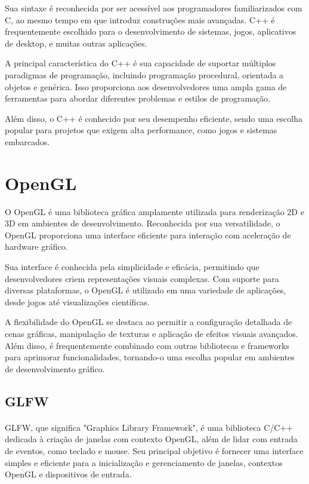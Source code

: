 \documentclass[12pt,a4paper]{memoir}
\begin{document}
Sua sintaxe é reconhecida por ser acessível aos programadores familiarizados com C, ao mesmo tempo em que introduz construções mais avançadas. C++ é frequentemente escolhido para o desenvolvimento de sistemas, jogos, aplicativos de desktop, e muitas outras aplicações.

A principal característica do C++ é sua capacidade de suportar múltiplos paradigmas de programação, incluindo programação procedural, orientada a objetos e genérica. Isso proporciona aos desenvolvedores uma ampla gama de ferramentas para abordar diferentes problemas e estilos de programação.

Além disso, o C++ é conhecido por seu desempenho eficiente, sendo uma escolha popular para projetos que exigem alta performance, como jogos e sistemas embarcados.



\section{OpenGL}
\label{chap2:sec:opengl}
O OpenGL é uma biblioteca gráfica amplamente utilizada para renderização 2D e 3D em ambientes de desenvolvimento. Reconhecida por sua versatilidade, o OpenGL proporciona uma interface eficiente para interação com aceleração de hardware gráfico.

Sua interface é conhecida pela simplicidade e eficácia, permitindo que desenvolvedores criem representações visuais complexas. Com suporte para diversas plataformas, o OpenGL é utilizado em uma variedade de aplicações, desde jogos até visualizações científicas.

A flexibilidade do OpenGL se destaca ao permitir a configuração detalhada de cenas gráficas, manipulação de texturas e aplicação de efeitos visuais avançados. Além disso, é frequentemente combinado com outras bibliotecas e frameworks para aprimorar funcionalidades, tornando-o uma escolha popular em ambientes de desenvolvimento gráfico.
\paragraph{}


\subsection{GLFW}
\label{chap2:sec:glfw}
\paragraph{}
GLFW, que significa "Graphics Library Framework", é uma biblioteca C/C++ dedicada à criação de janelas com contexto OpenGL, além de lidar com entrada de eventos, como teclado e mouse. Seu principal objetivo é fornecer uma interface simples e eficiente para a inicialização e gerenciamento de janelas, contextos OpenGL e dispositivos de entrada.
\end{document}
